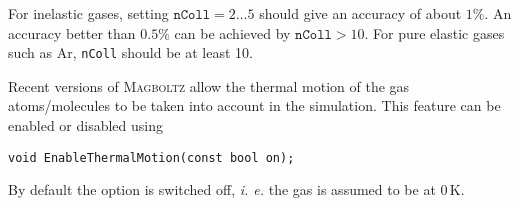 For inelastic gases, setting \(\texttt{nColl} = 2 \dots 5\)
should give an accuracy of about \(1\%\). 
An accuracy better than \(0.5\%\) can be achieved by 
\(\texttt{nColl} > 10\). 
For pure elastic gases such as Ar, \texttt{nColl} should 
be at least 10.  

Recent versions of \textsc{Magboltz} allow the thermal motion of the gas 
atoms/molecules to be taken into account in the simulation. 
This feature can be enabled or disabled using
\begin{lstlisting}
void EnableThermalMotion(const bool on);
\end{lstlisting} 
By default the option is switched off, \textit{i. e.} the gas 
is assumed to be at 0\,K. 

 
